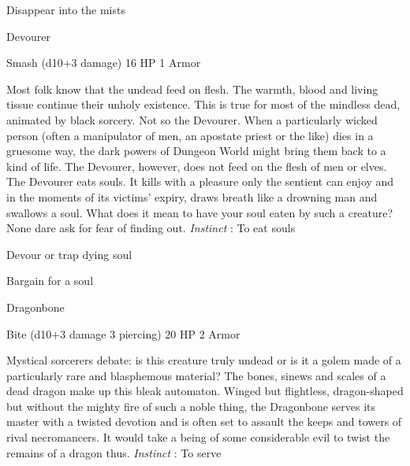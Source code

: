          
\item Disappear into the mists

       
\stopitemize
       
\startMonsterName
Devourer	 
\stopMonsterName
       

Smash (d10+3 damage)	16 HP	1 Armor

       


       
\startMonsterDescription
Most folk know that the undead feed on flesh.  The warmth, blood and living tissue continue their unholy existence.  This is true for most of the mindless dead, animated by black sorcery.  Not so the Devourer.  When a particularly wicked person (often a manipulator of men, an apostate priest or the like) dies in a gruesome way, the dark powers of Dungeon World might bring them back to a kind of life.  The Devourer, however, does not feed on the flesh of men or elves.  The Devourer eats souls.  It kills with a pleasure only the sentient can enjoy and in the moments of its victims’ expiry, draws breath like a drowning man and swallows a soul.  What does it mean to have your soul eaten by such a creature?  None dare ask for fear of finding out. {\em Instinct} : To eat souls
\stopMonsterDescription
       
\startitemize[1,packed]
         
\item Devour or trap dying soul

         
\item Bargain for a soul

       
\stopitemize
       
\startMonsterName
Dragonbone	 
\stopMonsterName
       

Bite (d10+3 damage 3 piercing)	20 HP	2 Armor

       


       
\startMonsterDescription
Mystical sorcerers debate: is this creature truly undead or is it a golem made of a particularly rare and blasphemous material?  The bones, sinews and scales of a dead dragon make up this bleak automaton.  Winged but flightless, dragon-shaped but without the mighty fire of such a noble thing, the Dragonbone serves its master with a twisted devotion and is often set to assault the keeps and towers of rival necromancers.  It would take a being of some considerable evil to twist the remains of a dragon thus. {\em Instinct} : To serve
\stopMonsterDescription
       
